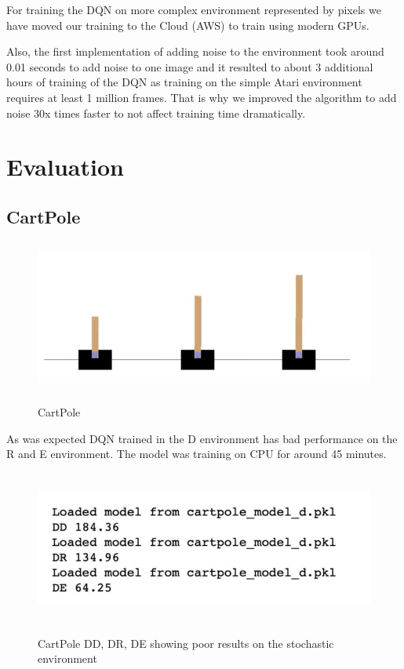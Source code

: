 For training the DQN on more complex environment represented by pixels we have moved our training to the Cloud (AWS) to train using modern GPUs.

Also, the first implementation of adding noise to the environment took around 0.01 seconds to add noise to one image and it resulted to about 3 additional hours of training of the DQN as training on the simple Atari environment requires at least 1 million frames. That is why we improved the algorithm to add noise 30x times faster to not affect training time dramatically.

\section{Evaluation}

\subsection{CartPole}

\begin{figure}[H]
\centering
\includegraphics[height=5cm]{CartPole.png}\\[0.5cm] 
\caption{CartPole}
\end{figure}

As was expected DQN trained in the D environment has bad performance on the R and E environment. The model was training on CPU for around 45 minutes.

\begin{figure}[H]
\centering
\includegraphics[height=5cm]{CartPole_bad_results.png}\\[0.5cm] 
\caption{CartPole DD, DR, DE showing poor results on the stochastic environment}
\end{figure}

